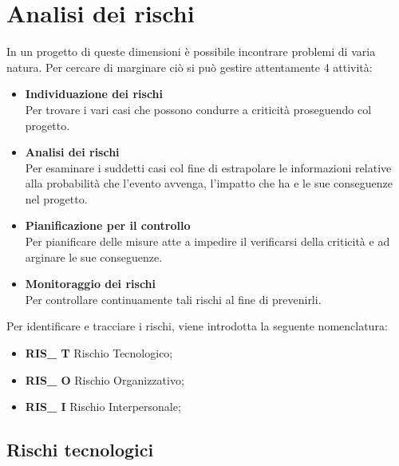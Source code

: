 \section{Analisi dei rischi}
In un progetto di queste dimensioni è possibile incontrare problemi di varia natura. Per cercare di marginare ciò si può gestire attentamente 4 attività:
\begin{itemize}
	\item \textbf{Individuazione dei rischi} \\ Per trovare i vari casi che possono condurre a criticità proseguendo col progetto.
	\item \textbf{Analisi dei rischi} \\ Per esaminare i suddetti casi col fine di estrapolare le informazioni relative alla probabilità che l'evento avvenga, l'impatto che ha e le sue conseguenze nel progetto.
	\item \textbf{Pianificazione per il controllo} \\ Per pianificare delle misure atte a impedire il verificarsi della criticità e ad arginare le sue conseguenze.
	\item \textbf{Monitoraggio dei rischi} \\ Per controllare continuamente tali rischi al fine di prevenirli.
\end{itemize}

Per identificare e tracciare i rischi, viene introdotta la seguente nomenclatura:
\begin{itemize}
	\item \textbf{RIS\_ T} Rischio Tecnologico;
	\item \textbf{RIS\_ O} Rischio Organizzativo;
	\item \textbf{RIS\_ I} Rischio Interpersonale;
\end{itemize}

\subsection{Rischi tecnologici}



